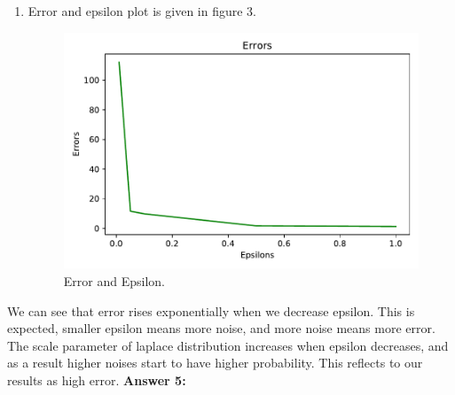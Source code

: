 \documentclass[12pt,reqno]{amsart}
\begin{document}
\begin{enumerate}[label=(\alph*)]
\item Error and epsilon plot is given in figure 3.
\begin{figure}[ht]
 	\label{fig:err}
 	\caption{Error and Epsilon.}
 	\includegraphics[width=0.7\linewidth]{errorEps.pdf}
\end{figure}
\end{enumerate}
We can see that error rises exponentially when we decrease epsilon. This is expected, smaller epsilon means more noise, and more noise means more error. The scale parameter of laplace distribution increases when epsilon decreases, and as a result higher noises start to have higher probability. This reflects to our results as high error.
\newpage
\textbf{Answer 5:} 
\end{document}
